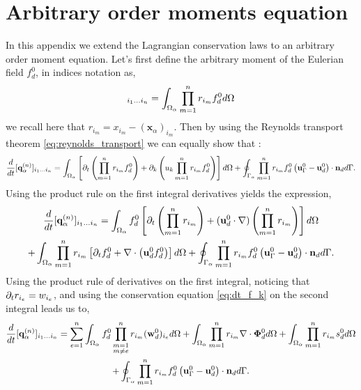 
\section{Arbitrary order moments equation}
\label{ap:Moments_equations}
In this appendix we extend the Lagrangian conservation laws to an arbitrary order moment equation. 
Let's first define the arbitrary moment of the Eulerian field $f_d^0$, in indices notation as, 
\begin{equation*}
    [\textbf{q}_\alpha^{(n)}]_{i_1\ldots i_n}
    = \intO{
    \pri{1}{n} f_d^0 
    }
\end{equation*}
we recall here that $r_{i_m} = x_{i_m} - (\textbf{x}_\alpha)_{i_m}$. 
Then by using the Reynolds transport theorem \ref{eq:reynolds_transport} we can equally show that :
\begin{equation}
    \frac{d}{dt} {[\textbf{q}_\alpha^{(n)}]_{i_1\ldots i_n}}
    =\int_{\Omega_{\alpha}} 
        \left[ \partial_t \left(\prod_{m=1}^{n} r_{i_m}f_d^0\right) 
    + \partial_k \left(u_k \prod_{m=1}^{n} r_{i_m}f_d^0\right) \right]
     d\Omega
    +\oint_{\Gamma_{\alpha}}  \prod_{m=1}^{n} r_{i_m} f_d^0 \left(\textbf{u}_\Gamma^0 - \textbf{u}_d^0\right)\cdot \textbf{n}_d  d\Gamma. 
\end{equation}
Using the product rule on the first integral derivatives yields the expression, 
\begin{multline*}
    \frac{d}{dt} {[\textbf{q}_\alpha^{(n)}]_{i_1\ldots i_n}}
    =\int_{\Omega_{\alpha}}  
        f_d^0 \left[ \partial_t \left(\prod_{m=1}^{n} r_{i_m}\right) 
        + (\textbf{u}_d^0\cdot \mathbf{\nabla}) \left( \prod_{m=1}^{n} r_{i_m}\right) \right]
     d\Omega\\
    +\int_{\Omega_{\alpha}}  
        \prod_{m=1}^{n} r_{i_m} 
        \left[ \partial_t f_d^0
    +  \mathbf{\nabla}\cdot \left(\textbf{u}_d^0 f_d^0 \right) \right]
     d\Omega
    +\oint_{\Gamma_{\alpha}}  \prod_{m=1}^{n} r_{i_m} f_d^0 \left(\textbf{u}_\Gamma^0 - \textbf{u}_d^0\right)\cdot \textbf{n}_d  d\Gamma. 
\end{multline*}
Using the product rule of derivatives on the first integral, noticing that $\partial_t r_{i_e} = w_{i_e}$, and using the conservation equation \ref{eq:dt_f_k} on the second integral leads us to, 
\begin{multline*}
    \frac{d}{dt} {[\textbf{q}_\alpha^{(n)}]_{i_1\ldots i_n}}
    = \sum_{e=1}^{n} \int_{\Omega_{\alpha}}  
        f_d^0 \prod^{n}_{\substack{ m=1 \\   m \neq e}} r_{i_m} (\textbf{w}_d^0)_{i_e}
         d\Omega
    +\int_{\Omega_{\alpha}} \prod_{m=1}^{n} r_{i_m} \mathbf{\nabla}\cdot\bm{\Phi}_d^0 d\Omega
    + \int_{\Omega_{\alpha}}  \prod_{m=1}^{n} r_{i_m} s_d^0 d\Omega\\
    +\oint_{\Gamma_{\alpha}}  \prod_{m=1}^{n} r_{i_m} f_d^0 \left(\textbf{u}_\Gamma^0 - \textbf{u}_d^0\right)\cdot \textbf{n}_d  d\Gamma.
\end{multline*}
